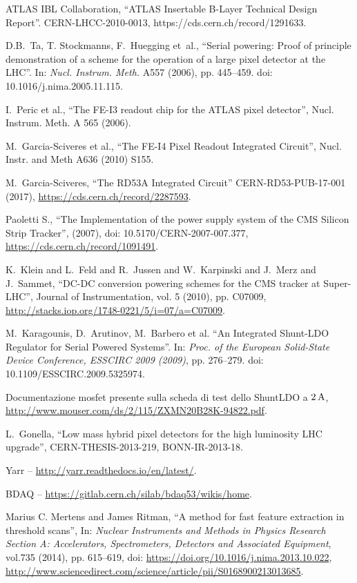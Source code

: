 \begin{thebibliography}{1}
 ATLAS IBL Collaboration, ``ATLAS Insertable B-Layer
  Technical Design Report''. CERN-LHCC-2010-0013, https://cds.cern.ch/record/1291633.

 D.B.~Ta, T. Stockmanns, F.~Huegging et~al., ``Serial powering: Proof of principle demonstration of a scheme for the operation of a large pixel detector at the LHC''. In: \textit{Nucl. Instrum. Meth.} A557 (2006), pp. 445--459. doi: 10.1016/j.nima.2005.11.115.

 I.~Peric et al., ``The FE-I3 readout chip for the ATLAS pixel detector'', Nucl. Instrum. Meth. A 565 (2006).

 M.~Garcia-Sciveres et al., ``The FE-I4 Pixel Readout
  Integrated Circuit'', Nucl. Instr. and Meth A636 (2010) S155.

 M.~Garcia-Sciveres, ``The RD53A Integrated Circuit''
  CERN-RD53-PUB-17-001 (2017), \url{https://cds.cern.ch/record/2287593}.


 Paoletti S., ``The Implementation of the power supply system of the CMS Silicon Strip Tracker'', (2007),  doi: 10.5170/CERN-2007-007.377, \url{https://cds.cern.ch/record/1091491}.

K.~Klein and L.~Feld and R.~Jussen and W.~Karpinski and J.~Merz and J.~Sammet, ``DC-DC conversion powering schemes for the CMS tracker at Super-LHC'', Journal of Instrumentation, vol. 5 (2010), pp. C07009, \url{http://stacks.iop.org/1748-0221/5/i=07/a=C07009}.

 M.~Karagounis, D.~Arutinov, M.~Barbero et al. ``An Integrated Shunt-LDO Regulator for Serial Powered Systems''. In: \textit{Proc. of the European Solid-State Device Conference,
ESSCIRC 2009 (2009)}, pp. 276–279. doi: 10.1109/ESSCIRC.2009.5325974.

 Documentazione mosfet presente sulla scheda di test dello ShuntLDO a $2\rm \, A$,  
  \url{http://www.mouser.com/ds/2/115/ZXMN20B28K-94822.pdf}.


 L.~Gonella, ``Low mass hybrid pixel detectors for the high luminosity LHC upgrade'', CERN-THESIS-2013-219, BONN-IR-2013-18.

 Yarr -- \url{http://yarr.readthedocs.io/en/latest/}.

 BDAQ -- \url{https://gitlab.cern.ch/silab/bdaq53/wikis/home}.

 Marius C. Mertens and James Ritman, ``A method for fast feature extraction in threshold scans'', 
In: \textit{Nuclear Instruments and Methods in Physics Research Section A: Accelerators, Spectrometers, Detectors and Associated Equipment}, 
vol.735 (2014), pp. 615--619, doi: \url{https://doi.org/10.1016/j.nima.2013.10.022}, 
\url{http://www.sciencedirect.com/science/article/pii/S0168900213013685}.


\end{thebibliography}